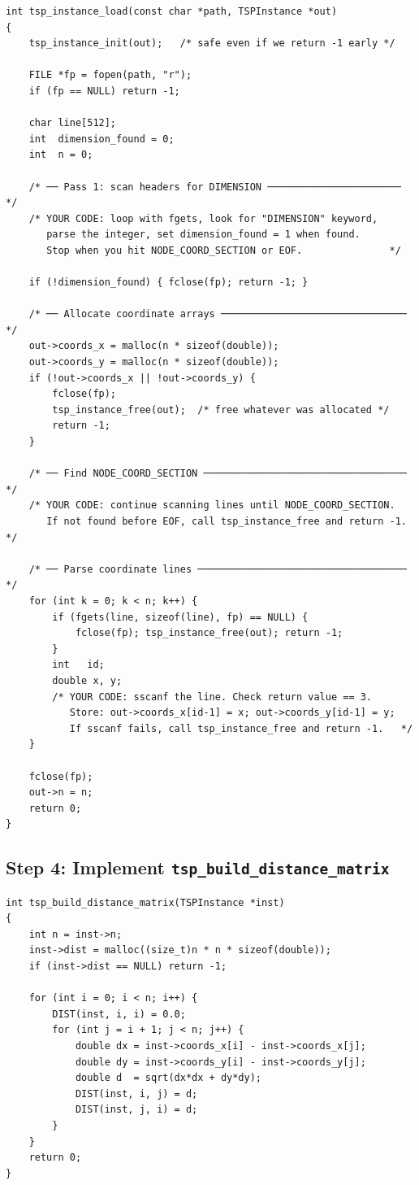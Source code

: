 \documentclass[11pt]{article}
\begin{document}
\begin{lstlisting}[style=cstyle]
int tsp_instance_load(const char *path, TSPInstance *out)
{
    tsp_instance_init(out);   /* safe even if we return -1 early */

    FILE *fp = fopen(path, "r");
    if (fp == NULL) return -1;

    char line[512];
    int  dimension_found = 0;
    int  n = 0;

    /* ── Pass 1: scan headers for DIMENSION ─────────────────────── */
    /* YOUR CODE: loop with fgets, look for "DIMENSION" keyword,
       parse the integer, set dimension_found = 1 when found.
       Stop when you hit NODE_COORD_SECTION or EOF.               */

    if (!dimension_found) { fclose(fp); return -1; }

    /* ── Allocate coordinate arrays ──────────────────────────────── */
    out->coords_x = malloc(n * sizeof(double));
    out->coords_y = malloc(n * sizeof(double));
    if (!out->coords_x || !out->coords_y) {
        fclose(fp);
        tsp_instance_free(out);  /* free whatever was allocated */
        return -1;
    }

    /* ── Find NODE_COORD_SECTION ─────────────────────────────────── */
    /* YOUR CODE: continue scanning lines until NODE_COORD_SECTION.
       If not found before EOF, call tsp_instance_free and return -1. */

    /* ── Parse coordinate lines ──────────────────────────────────── */
    for (int k = 0; k < n; k++) {
        if (fgets(line, sizeof(line), fp) == NULL) {
            fclose(fp); tsp_instance_free(out); return -1;
        }
        int   id;
        double x, y;
        /* YOUR CODE: sscanf the line. Check return value == 3.
           Store: out->coords_x[id-1] = x; out->coords_y[id-1] = y;
           If sscanf fails, call tsp_instance_free and return -1.   */
    }

    fclose(fp);
    out->n = n;
    return 0;
}
\end{lstlisting}

\subsection{Step 4: Implement \texttt{tsp\_build\_distance\_matrix}}

\begin{lstlisting}[style=cstyle]
int tsp_build_distance_matrix(TSPInstance *inst)
{
    int n = inst->n;
    inst->dist = malloc((size_t)n * n * sizeof(double));
    if (inst->dist == NULL) return -1;

    for (int i = 0; i < n; i++) {
        DIST(inst, i, i) = 0.0;
        for (int j = i + 1; j < n; j++) {
            double dx = inst->coords_x[i] - inst->coords_x[j];
            double dy = inst->coords_y[i] - inst->coords_y[j];
            double d  = sqrt(dx*dx + dy*dy);
            DIST(inst, i, j) = d;
            DIST(inst, j, i) = d;
        }
    }
    return 0;
}
\end{lstlisting}
\end{document}
